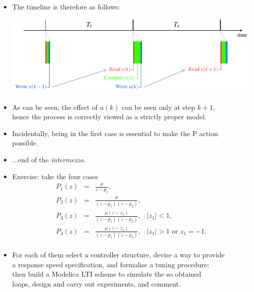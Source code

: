 \begin{frame}
\myPause
 \begin{itemize}[<+-| alert@+>]
 \item The timeline is therefore as follows:
       \begin{center}
        \vspace{1mm}\includegraphics[width=0.70\columnwidth]{./Unit-07/img/CtrlTimeline.pdf}
       \end{center}
 \item As can be seen, the effect of $u(k)$ can be seen only at step $k+1$,\\
       hence the process is correctly viewed as a strictly proper model.
 \item Incidentally, being in the first case is essential to make the P action\\
       possible.
 \item ...end of the \emph{intermezzo}.
 \end{itemize}
\end{frame}

\begin{frame}
\myPause
 \begin{itemize}[<+-| alert@+>]
 \item Exercise: take the four cases
       \begin{displaymath}
        \begin{array}{rcll}
         P_1(z) &=& \frac{\mu}{z-p_1},                                               \\
         P_2(z) &=& \frac{\mu}{(z-p_1)(z-p_2)},                                      \\
         P_3(z) &=& \frac{\mu(z-z_1)}{(z-p_1)(z-p_2)}, & |z_1|<1,                    \\
         P_4(z) &=& \frac{\mu(z-z_1)}{(z-p_1)(z-p_2)}, & |z_1|>1 \text{ or } z_1=-1. \\
        \end{array}
       \end{displaymath}
 \item For each of them select a controller structure, devise a way to provide\\
       a response speed specification, and formalise a tuning procedure;\\
       then build a Modelica LTI scheme to simulate the so obtained\\
       loops, design and carry out experiments, and comment.
 \end{itemize}
\end{frame}

